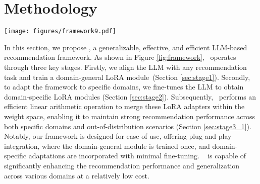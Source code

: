 \section{Methodology}
\iffalse
\begin{figure}[b]
    \centering
     \texttt{[image: figures/phase1\_3.pdf]}
    \caption{Illustration of aligning LLM with recommendation task.}
    \label{fig:phase1}
    \Description{}
\end{figure}
\fi
\begin{figure*}[ht]
    \centering \texttt{[image: figures/framework9.pdf]}
    \vspace{-0.2cm}
    \caption{Illustration of our proposed \shortname~framework.
    Firstly, to align LLM with any recommendation task, we construct a generalizable base model. Secondly, we fine-tune LLM to get domain-specific LoRA plugins. Finally, we perform a highly efficient and effective linear arithmetic operation to merge these LoRA adapters within the weight space, allowing \shortname~to maintain strong recommendation performance across both specific domains and out-of-distribution scenarios.}
    \label{fig:framework}
    \Description{}
\end{figure*}
In this section, we propose \shortname, a generalizable, effective, and efficient LLM-based recommendation framework. As shown in Figure \ref{fig:framework}, \shortname~operates through three key stages. 
Firstly, we align the LLM with any recommendation task and train a domain-general LoRA module~(Section \ref{sec:stage1}). Secondly, to adapt the framework to specific domains, we fine-tunes the LLM to obtain domain-specific LoRA modules (Section \ref{sec:stage2}). Subsequently, \shortname~performs an efficient linear arithmetic operation to merge these LoRA adapters within the weight space, enabling it to maintain strong recommendation performance across both specific domains and out-of-distribution scenarios (Section \ref{sec:stage3_1}). Notably, our framework is designed for ease of use, offering plug-and-play integration, where the domain-general module is trained once, and domain-specific adaptations are incorporated with minimal fine-tuning. \shortname~ is capable of significantly enhancing the recommendation performance and generalization across various domains at a relatively low cost.

\iffalse
First, the recommendation ability alignment stage aligns the pre-trained LLM with the general characteristics of recommendation tasks using an autoregressive objective (Section \ref{sec:stage1}). Next, the domain-specific fine-tuning stage incorporates specialized knowledge from specific domains (e.g., movies, beauty products) into the pre-trained LLM (Section \ref{sec:stage2}). Finally, we introduce the Mixture-of-LoRA method to address specific recommendation scenarios by adaptively integrating general and domain-specific knowledge. This approach significantly enhances the model's recommendation performance and generalization ability without increasing inference time or the number of model parameters (Section \ref{sec:stage3_1}).
\fi

